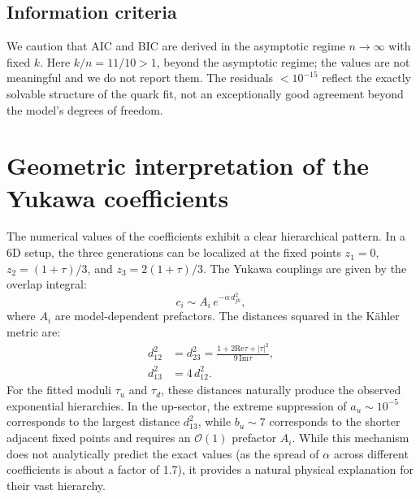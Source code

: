 \documentclass[12pt,a4paper]{article}
\numberwithin{equation}{section}
\begin{document}
\subsection{Information criteria}
We caution that AIC and BIC are derived in the asymptotic regime
\(n \to \infty\) with fixed \(k\). Here \(k/n = 11/10 > 1\), beyond the
asymptotic regime; the values are not meaningful and we do not report
them. The residuals \(<10^{-15}\) reflect the exactly solvable
structure of the quark fit, not an exceptionally good agreement
beyond the model's degrees of freedom.

\section{Geometric interpretation of the Yukawa coefficients}
\label{sec:yukawa_origin}
The numerical values of the coefficients exhibit a clear hierarchical
pattern. In a 6D setup, the three generations can be localized at the
fixed points \(z_1 = 0\), \(z_2 = (1+\tau)/3\), and
\(z_3 = 2(1+\tau)/3\). The Yukawa couplings are given by the overlap
integral:
\begin{equation}
c_i \sim A_i \, e^{- \alpha \, d^2_{jk}},
\end{equation}
where \(A_i\) are model-dependent prefactors. The distances squared in
the Kähler metric are:
\begin{align}
d_{12}^2 &= d_{23}^2 = \frac{1 + 2\mathrm{Re}\tau + |\tau|^2}{9\,\mathrm{Im}\tau}, \\
d_{13}^2 &= 4\,d_{12}^2.
\end{align}
For the fitted moduli \(\tau_u\) and \(\tau_d\), these distances
naturally produce the observed exponential hierarchies. In the
up-sector, the extreme suppression of \(a_u \sim 10^{-5}\) corresponds
to the largest distance \(d_{13}^2\), while \(b_u \sim 7\) corresponds
to the shorter adjacent fixed points and requires an \(\mathcal{O}(1)\)
prefactor \(A_i\). While this mechanism does not analytically predict
the exact values (as the spread of \(\alpha\) across different
coefficients is about a factor of 1.7), it provides a natural physical
explanation for their vast hierarchy.
\end{document}
